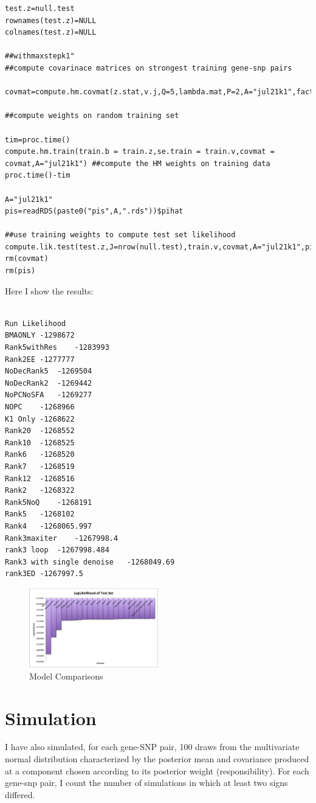 \documentclass[10pt]{article}
\begin{document}
\begin{itemize}
\begin{verbatim}
test.z=null.test
rownames(test.z)=NULL
colnames(test.z)=NULL

##withmaxstepk1"
##compute covarinace matrices on strongest training gene-snp pairs

covmat=compute.hm.covmat(z.stat,v.j,Q=5,lambda.mat,P=2,A="jul21k1",factor.mat,max.step=max.stepk1)

##compute weights on random training set

tim=proc.time()
compute.hm.train(train.b = train.z,se.train = train.v,covmat = covmat,A="jul21k1") ##compute the HM weights on training data
proc.time()-tim

A="jul21k1"
pis=readRDS(paste0("pis",A,".rds"))$pihat

##use training weights to compute test set likelihood
compute.lik.test(test.z,J=nrow(null.test),train.v,covmat,A="jul21k1",pis) 
rm(covmat)
rm(pis)
\end{verbatim}

Here I show the results:



\begin{verbatim}

Run	Likelihood
BMAONLY	-1298672
Rank5withRes	-1283993
Rank2EE	-1277777
NoDecRank5	-1269504
NoDecRank2	-1269442
NoPCNoSFA	-1269277
NOPC	-1268966
K1 Only	-1268622
Rank20	-1268552
Rank10	-1268525
Rank6	-1268520
Rank7	-1268519
Rank12	-1268516
Rank2	-1268322
Rank5NoQ	-1268191
Rank5	-1268102
Rank4	-1268065.997
Rank3maxiter	-1267998.4
rank3 loop 	-1267998.484
Rank3 with single denoise	-1268049.69
rank3ED	-1267997.5

\end{verbatim}


\begin{figure}[h!]
  \caption{Model Comparisons}
  \centering
    \includegraphics[width=0.5\textwidth]{../Figures/loglik.png}
\end{figure}


\section{Simulation}
I have also simulated, for each gene-SNP pair, 100 draws from the multivariate normal distribution characterized by the posterior mean and covariance produced at a component chosen according to its posterior weight (responsibility). For each gene-snp pair, I count the number of simulations in which at least two signs differed. 


\end{itemize}
\end{document}
